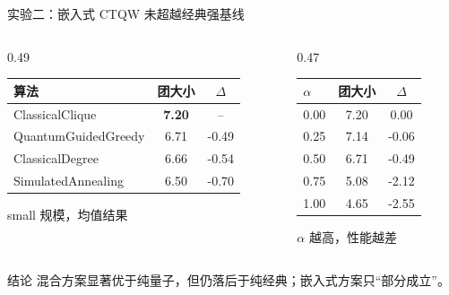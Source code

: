\documentclass[aspectratio=169,10pt]{ctexbeamer}
\begin{document}
\begin{frame}{实验二：嵌入式 CTQW 未超越经典强基线}
  \begin{columns}[T,onlytextwidth]
    \begin{column}{0.49\textwidth}
      \centering
      \begin{tabular}{lcc}
        \toprule
        算法 & 团大小 & $\Delta$ \\
        \midrule
        ClassicalClique & \textbf{7.20} & -- \\
        QuantumGuidedGreedy & 6.71 & -0.49 \\
        ClassicalDegree & 6.66 & -0.54 \\
        SimulatedAnnealing & 6.50 & -0.70 \\
        \bottomrule
      \end{tabular}
      \vspace{0.4em}

      \small small 规模，均值结果
    \end{column}
    \begin{column}{0.47\textwidth}
      \centering
      \begin{tabular}{lcc}
        \toprule
        $\alpha$ & 团大小 & $\Delta$ \\
        \midrule
        0.00 & 7.20 & 0.00 \\
        0.25 & 7.14 & -0.06 \\
        0.50 & 6.71 & -0.49 \\
        0.75 & 5.08 & -2.12 \\
        1.00 & 4.65 & -2.55 \\
        \bottomrule
      \end{tabular}
      \vspace{0.4em}

      \small $\alpha$ 越高，性能越差
    \end{column}
  \end{columns}

  \vspace{1em}
  \begin{alertblock}{结论}
    混合方案显著优于纯量子，但仍落后于纯经典；嵌入式方案只“部分成立”。
  \end{alertblock}
\end{frame}
\end{document}
